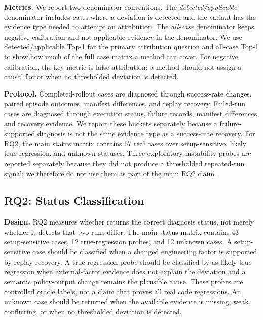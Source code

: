 \noindent\textbf{Metrics.} We report two denominator conventions. The \emph{detected/applicable} denominator includes cases where a deviation is detected and the variant has the evidence type needed to attempt an attribution. The \emph{all-case} denominator keeps negative calibration and not-applicable evidence in the denominator. We use detected/applicable Top-1 for the primary attribution question and all-case Top-1 to show how much of the full case matrix a method can cover. For negative calibration, the key metric is false attribution: a method should not assign a causal factor when no thresholded deviation is detected.

\noindent\textbf{Protocol.} Completed-rollout cases are diagnosed through success-rate changes, paired episode outcomes, manifest differences, and replay recovery. Failed-run cases are diagnosed through execution status, failure records, manifest differences, and recovery evidence. We report these buckets separately because a failure-supported diagnosis is not the same evidence type as a success-rate recovery. For RQ2, the main status matrix contains 67 real cases over setup-sensitive, likely true-regression, and unknown statuses. Three exploratory instability probes are reported separately because they did not produce a thresholded repeated-run signal; we therefore do not use them as part of the main RQ2 claim.

\subsection{RQ2: Status Classification}
\label{sub:rq2}

\noindent\textbf{Design.} RQ2 measures whether \sys returns the correct diagnosis status, not merely whether it detects that two runs differ. The main status matrix contains 43 setup-sensitive cases, 12 true-regression probes, and 12 unknown cases. A setup-sensitive case should be classified when a changed engineering factor is supported by replay recovery. A true-regression probe should be classified by \sys as likely true regression when external-factor evidence does not explain the deviation and a semantic policy-output change remains the plausible cause. These probes are controlled oracle labels, not a claim that \sys proves all real code regressions. An unknown case should be returned when the available evidence is missing, weak, conflicting, or when no thresholded deviation is detected.

